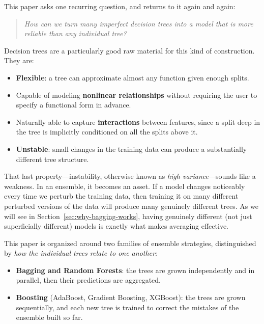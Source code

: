 \documentclass[12pt,a4paper]{article}
\begin{document}
This paper asks one recurring question, and returns to it again and again:

\begin{quote}
\emph{How can we turn many imperfect decision trees into a model that is more reliable than any individual tree?}
\end{quote}

Decision trees are a particularly good raw material for this kind of construction. They are:

\begin{itemize}[nosep]
    \item \textbf{Flexible}: a tree can approximate almost any function given enough splits.
    \item Capable of modeling \textbf{nonlinear relationships} without requiring the user to specify a functional form in advance.
    \item Naturally able to capture \textbf{interactions} between features, since a split deep in the tree is implicitly conditioned on all the splits above it.
    \item \textbf{Unstable}: small changes in the training data can produce a substantially different tree structure.
\end{itemize}

That last property---instability, otherwise known as \emph{high variance}---sounds like a weakness. In an ensemble, it becomes an asset. If a model changes noticeably every time we perturb the training data, then training it on many different perturbed versions of the data will produce many genuinely different trees. As we will see in Section~\ref{sec:why-bagging-works}, having genuinely different (not just superficially different) models is exactly what makes averaging effective.

This paper is organized around two families of ensemble strategies, distinguished by \emph{how the individual trees relate to one another}:

\begin{itemize}[nosep]
    \item \textbf{Bagging and Random Forests}: the trees are grown independently and in parallel, then their predictions are aggregated.
    \item \textbf{Boosting} (AdaBoost, Gradient Boosting, XGBoost): the trees are grown sequentially, and each new tree is trained to correct the mistakes of the ensemble built so far.
\end{itemize}
\end{document}
